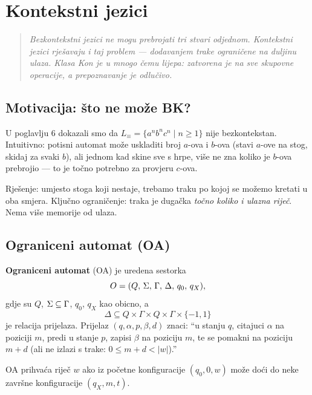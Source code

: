 \chapter{Kontekstni jezici}
\label{chap:7}

\begin{quote}
\itshape
Bezkontekstni jezici ne mogu prebrojati tri stvari odjednom.
Kontekstni jezici rješavaju i taj problem --- dodavanjem trake
ograničene na duljinu ulaza. Klasa Kon je u mnogo čemu lijepa:
zatvorena je na sve skupovne operacije, a prepoznavanje je odlučivo.
\end{quote}


\section{Motivacija: što ne može BK?}

U poglavlju 6 dokazali smo da $L_\equiv = \{a^n b^n c^n \mid n \geq 1\}$
nije bezkontekstan. Intuitivno: potisni automat može uskladiti
broj $a$-ova i $b$-ova (stavi $a$-ove na stog, skidaj za svaki $b$),
ali jednom kad skine sve s hrpe, više ne zna koliko je $b$-ova prebrojio ---
to je točno potrebno za provjeru $c$-ova.

Rješenje: umjesto stoga koji nestaje, trebamo traku po kojoj se
možemo kretati u oba smjera. Ključno ograničenje: traka je dugačka
\emph{točno koliko i ulazna riječ}. Nema više memorije od ulaza.

\section{Ograniceni automat (OA)}

\begin{definicija}
\textbf{Ograniceni automat} (OA) je uredena sestorka
\[
  O = (Q,\, \Sigma,\, \Gamma,\, \Delta,\, q_0,\, q_X),
\]
gdje su $Q$, $\Sigma \subseteq \Gamma$, $q_0$, $q_X$ kao obicno, a
\[
  \Delta \subseteq Q \times \Gamma \times Q \times \Gamma \times \{-1, 1\}
\]
je relacija prijelaza. Prijelaz $(q, \alpha, p, \beta, d)$ znaci:
``u stanju $q$, citajuci $\alpha$ na poziciji $m$, predi u stanje $p$,
zapisi $\beta$ na poziciju $m$, te se pomakni na poziciju $m + d$
(ali ne izlazi s trake: $0 \leq m + d < |w|$).''

OA prihvaća riječ $w$ ako iz početne konfiguracije $(q_0, 0, w)$
može doći do neke završne konfiguracije $(q_X, m, t)$.
\end{definicija}

